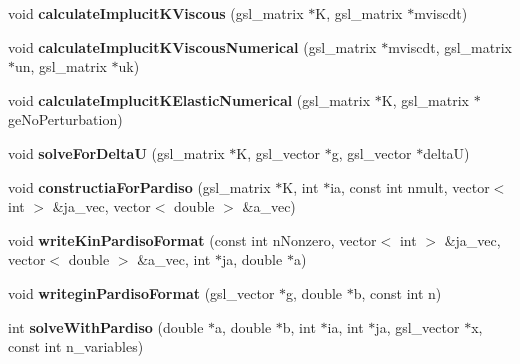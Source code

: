 \begin{DoxyCompactItemize}
\item 
\hypertarget{classSimulation_a72f041b29cffd4b018afd3a8fea9f758}{}void {\bfseries calculate\+Implucit\+K\+Viscous} (gsl\+\_\+matrix $\ast$K, gsl\+\_\+matrix $\ast$mviscdt)\label{classSimulation_a72f041b29cffd4b018afd3a8fea9f758}

\item 
\hypertarget{classSimulation_a6619bac88b13310f52a396a316577787}{}void {\bfseries calculate\+Implucit\+K\+Viscous\+Numerical} (gsl\+\_\+matrix $\ast$mviscdt, gsl\+\_\+matrix $\ast$un, gsl\+\_\+matrix $\ast$uk)\label{classSimulation_a6619bac88b13310f52a396a316577787}

\item 
\hypertarget{classSimulation_afea9ef41c9ecb5e5891b7787fb76bdf1}{}void {\bfseries calculate\+Implucit\+K\+Elastic\+Numerical} (gsl\+\_\+matrix $\ast$K, gsl\+\_\+matrix $\ast$ge\+No\+Perturbation)\label{classSimulation_afea9ef41c9ecb5e5891b7787fb76bdf1}

\item 
\hypertarget{classSimulation_a23927524ed4ee666bb3f7845b8e5c34f}{}void {\bfseries solve\+For\+Delta\+U} (gsl\+\_\+matrix $\ast$K, gsl\+\_\+vector $\ast$g, gsl\+\_\+vector $\ast$delta\+U)\label{classSimulation_a23927524ed4ee666bb3f7845b8e5c34f}

\item 
\hypertarget{classSimulation_aac47a578fcfe5935eca3fbb9580dc5b0}{}void {\bfseries constructia\+For\+Pardiso} (gsl\+\_\+matrix $\ast$K, int $\ast$ia, const int nmult, vector$<$ int $>$ \&ja\+\_\+vec, vector$<$ double $>$ \&a\+\_\+vec)\label{classSimulation_aac47a578fcfe5935eca3fbb9580dc5b0}

\item 
\hypertarget{classSimulation_a0f0e358f99d5f4a286a464342ab11104}{}void {\bfseries write\+Kin\+Pardiso\+Format} (const int n\+Nonzero, vector$<$ int $>$ \&ja\+\_\+vec, vector$<$ double $>$ \&a\+\_\+vec, int $\ast$ja, double $\ast$a)\label{classSimulation_a0f0e358f99d5f4a286a464342ab11104}

\item 
\hypertarget{classSimulation_ad834b670e7fc5a7933d441d2278d622d}{}void {\bfseries writegin\+Pardiso\+Format} (gsl\+\_\+vector $\ast$g, double $\ast$b, const int n)\label{classSimulation_ad834b670e7fc5a7933d441d2278d622d}

\item 
\hypertarget{classSimulation_acb243ba7dd91cba4e63533ae9b5edd8a}{}int {\bfseries solve\+With\+Pardiso} (double $\ast$a, double $\ast$b, int $\ast$ia, int $\ast$ja, gsl\+\_\+vector $\ast$x, const int n\+\_\+variables)\label{classSimulation_acb243ba7dd91cba4e63533ae9b5edd8a}


\end{DoxyCompactItemize}
